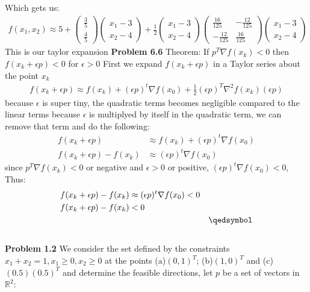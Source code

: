 \documentclass{article}
\begin{document}
Which gets us:
\begin{align*}
    f(x_1, x_2) \approx 5 + \begin{pmatrix} \frac{3}{5} \\ \frac{4}{5} \end{pmatrix}  
            \begin{pmatrix}
                x_1 - 3 \\ x_2 - 4
            \end{pmatrix} + \frac{1}{2} 
            \begin{pmatrix}
                x_1 - 3 \\ x_2 - 4
            \end{pmatrix}
            \begin{pmatrix} \frac{16}{125} & -\frac{12}{125} \\ -\frac{12}{125} & \frac{16}{125} \end{pmatrix}
            \begin{pmatrix}
                x_1 - 3 \\ x_2 - 4
            \end{pmatrix}
\end{align*} This is our taylor expansion \newline
\textbf{Problem 6.6} Theorem: If $ p^T \nabla f(x_k) < 0$ then $f(x_k + \epsilon p) < 0$ for $\epsilon > 0$
\proof First we expand $f(x_k + \epsilon p)$ in a Taylor series about the point $x_k$
\begin{align*}
    f(x_k + \epsilon p) \approx f(x_k) + (\epsilon p)^t \nabla f(x_0) + \frac{1}{2} (\epsilon p )^T \nabla^2 f(x_k)(\epsilon p)
\end{align*}
because $\epsilon$ is super tiny, the quadratic terms becomes negligible compared to the linear terms because  $\epsilon$ is multiplyed by itself in the quadratic term, we can remove that term and do the following:
\begin{align*}
    f(x_k + \epsilon p) & \approx f(x_k) + (\epsilon p)^t \nabla f(x_0) \\
    f(x_k + \epsilon p) - f(x_k) & \approx (\epsilon p)^t \nabla f(x_0)
\end{align*}
since $ p^T \nabla f(x_k) < 0$ or negative and $\epsilon > 0$ or positive, $(\epsilon p)^t \nabla f(x_0) < 0$, Thus:
\begin{align*}
    f(x_k + \epsilon p) - f(x_k) & \approx (\epsilon p)^t \nabla f(x_0) < 0 \\
    f(x_k + \epsilon p) - f(x_k) & < 0 \\
    \null && \qedsymbol
\end{align*} \\ 
\textbf{Problem 1.2} We consider the set defined by the constraints $x_1 + x_2 = 1, x_1 \geq 0, x_2 \geq 0 $ at the points (a)$(0,1)^T$; (b)$(1,0)^T$ and (c)$(0.5)(0.5)^T$ and determine the feasible directions, let $p$ be a set of vectors in $\mathbb{R}^2$:
\end{document}
